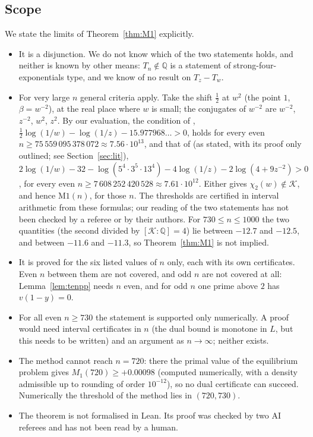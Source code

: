\documentclass[11pt]{amsart}
\theoremstyle{definition}
\theoremstyle{remark}
\numberwithin{equation}{section}
\newcommand{\QQ}{\mathbb{Q}}
\newcommand{\cK}{\mathcal{K}}
\begin{document}
\subsection{Scope}
We state the limits of Theorem~\ref{thm:M1} explicitly.
\begin{itemize}
\item It is a disjunction. We do not know which of the two statements holds, and neither is known by other means:
  $T_n\notin\QQ$ is a statement of strong-four-exponentials type, and we know of no result on $T_z-T_w$.
\item For very large $n$ general criteria apply. Take the shift $\frac12$ at $w^2$ (the point $1$, $\beta=w^{-2}$), at
  the real place where $w$ is small; the conjugates of $w^{-2}$ are $w^{-2}$, $z^{-2}$, $w^2$, $z^2$. By our evaluation,
  the condition of \cite[Thm.~1]{DHK2022b}, $\frac12\log(1/w)-\log(1/z)-15.977968\ldots>0$, holds for every even
  $n\ge75\,559\,095\,378\,072\approx7.56\cdot10^{13}$, and that of \cite[Thm.~2.1]{DHK2020} (as stated, with its proof
  only outlined; see Section~\ref{sec:lit}), $2\log(1/w)-32-\log(5^4\cdot3^5\cdot13^4)-4\log(1/z)-2\log(4+9z^{-2})>0$,
  for every even $n\ge7\,608\,252\,420\,528\approx7.61\cdot10^{12}$. Either gives $\chi_2(w)\notin\cK$, and hence
  $\mathrm{M1}(n)$, for those $n$. The thresholds are certified in interval arithmetic from these formulas; our reading
  of the two statements has not been checked by a referee or by their authors. For $730\le n\le1000$ the two quantities
  (the second divided by $[\cK:\QQ]=4$) lie between $-12.7$ and $-12.5$, and between $-11.6$ and $-11.3$, so
  Theorem~\ref{thm:M1} is not implied.
\item It is proved for the six listed values of $n$ only, each with its own certificates. Even $n$ between them are not
  covered, and odd $n$ are not covered at all: Lemma~\ref{lem:tenpp} needs $n$ even, and for odd $n$ one prime above
  $2$ has $v(1-y)=0$.
\item For all even $n\ge730$ the statement is supported only numerically. A proof would need interval certificates in $n$
  (the dual bound is monotone in $L$, but this needs to be written) and an argument as $n\to\infty$; neither exists.
\item The method cannot reach $n=720$: there the primal value of the equilibrium problem gives $M_1(720)\ge+0.00098$
  (computed numerically, with a density admissible up to rounding of order $10^{-12}$), so no dual certificate can
  succeed. Numerically the threshold of the method lies in $(720,730)$.
\item The theorem is not formalised in Lean. Its proof was checked by two AI referees and has not been read by a human.
\end{itemize}
\end{document}
